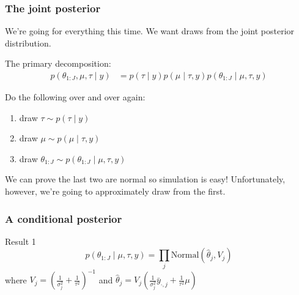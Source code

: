 \documentclass{beamer}
\begin{document}
\begin{frame}
\frametitle{The joint posterior }
We're going for everything this time. We want draws from the joint posterior distribution. 
\newline

The primary decomposition:
\begin{align*}
p(\theta_{1:J}, \mu, \tau \mid y) &= p(\tau \mid y) p(\mu \mid \tau, y) p(\theta_{1:J}\mid \mu, \tau,  y)
\end{align*}
\pause

Do the following over and over again:
\begin{enumerate}
\item draw $\tau \sim p(\tau \mid y)$
\item draw $\mu \sim p(\mu \mid \tau, y)$
\item draw $\theta_{1:J} \sim p(\theta_{1:J}\mid \mu, \tau,  y)$
\end{enumerate}
We can prove the last two are normal so simulation is easy! Unfortunately, however, we're going to approximately draw from the first. 

\end{frame}

\begin{frame}
\frametitle{A conditional posterior }

\begin{block}{Result 1}
\[
p(\theta_{1:J} \mid \mu, \tau, y) = \prod_j \text{Normal}(\hat{\theta}_j, V_j)
\]
where $V_j = \left(\frac{1}{\sigma^2_j} + \frac{1}{\tau^2} \right)^{-1}$ and $\hat{\theta}_j = V_j\left(\frac{1}{\sigma^2_j} \bar{y}_{\cdot,j} + \frac{1}{\tau^2}\mu \right) $
\end{block}

\end{frame}
\end{document}
